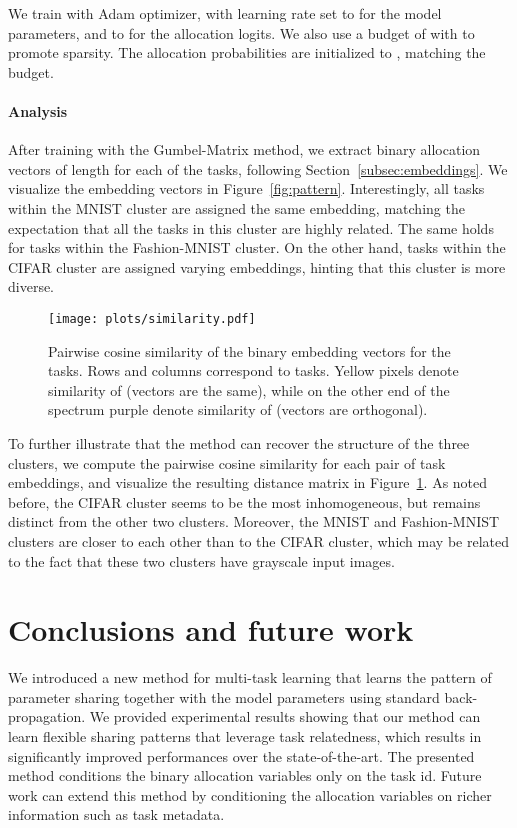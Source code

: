 \documentclass[conference]{IEEEtran}
\begin{document}
We train with Adam optimizer, with learning rate set to  for the model parameters, and to  for the allocation logits. We also use a budget of  with  to promote sparsity. The allocation probabilities are initialized to , matching the budget.

\paragraph{Analysis}

After training with the Gumbel-Matrix method, we extract binary allocation vectors of length  for each of the tasks, following Section~\ref{subsec:embeddings}.
We visualize the embedding vectors in Figure~\ref{fig:pattern}. Interestingly, all tasks within the MNIST cluster are assigned the same embedding, matching the expectation that all the tasks in this cluster are highly related. The same holds for tasks within the Fashion-MNIST cluster. On the other hand, tasks within the CIFAR cluster are assigned varying embeddings, hinting that this cluster is more diverse.

\begin{figure}[t]
\begin{center}
\texttt{[image: plots/similarity.pdf]}
\end{center}
\caption{Pairwise cosine similarity of the binary embedding vectors for the  tasks. Rows and columns correspond to tasks. Yellow pixels denote similarity of  (vectors are the same), while on the other end of the spectrum purple denote similarity of  (vectors are orthogonal).}\label{fig:similarity}
\end{figure}

To further illustrate that the method can recover the structure of the three clusters, we compute the pairwise cosine similarity for each pair of task embeddings, and visualize the resulting distance matrix in Figure~\ref{fig:similarity}. As noted before, the CIFAR cluster seems to be the most inhomogeneous, but remains distinct from the other two clusters. Moreover, the MNIST and Fashion-MNIST clusters are closer to each other than to the CIFAR cluster, which may be related to the fact that these two clusters have grayscale input images.

\section{Conclusions and future work}\label{sec:conclusions}
We introduced a new method for multi-task learning that learns the pattern of parameter sharing together with the model parameters using standard back-propagation. We provided experimental results showing that our method can learn flexible sharing patterns that leverage task relatedness, which results in significantly improved performances over the state-of-the-art.
The presented method conditions the binary allocation variables only on the task id. Future work can extend this method by conditioning the allocation variables on richer information such as task metadata.
\end{document}
